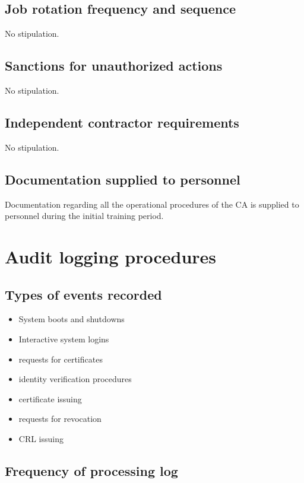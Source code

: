 \subsection{Job rotation frequency and sequence}

No stipulation.

\subsection{Sanctions for unauthorized actions}

No stipulation.

\subsection{Independent contractor requirements}

No stipulation.

\subsection{Documentation supplied to personnel}

Documentation regarding all the operational procedures of the CA is supplied to personnel during the initial training period.

\section{Audit logging procedures}
\subsection{Types of events recorded}

\begin{itemize}
\item{System boots and shutdowns}
\item{Interactive system logins}
\item{requests for certificates}
\item{identity verification procedures}
\item{certificate issuing}
\item{requests for revocation}
\item{CRL issuing}
\end{itemize}

\subsection{Frequency of processing log}

